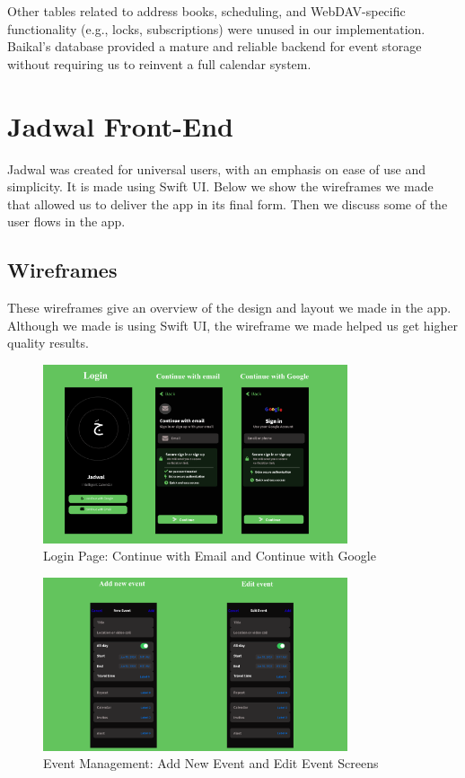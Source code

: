Other tables related to address books, scheduling, and WebDAV-specific functionality (e.g., locks, subscriptions) were unused in our implementation. Baikal's database provided a mature and reliable backend for event storage without requiring us to reinvent a full calendar system.

\section{Jadwal Front-End}

Jadwal was created for universal users, with an emphasis on ease of use and simplicity. It is made using Swift UI. Below we show the wireframes we made that allowed us to deliver the app in its final form. Then we discuss some of the user flows in the app.

\subsection{Wireframes}

These wireframes give an overview of the design and layout we made in the app. Although we made is using Swift UI, the wireframe we made helped us get higher quality results.

\begin{figure}[H]
    \centering
    \includegraphics[width=0.8\textwidth]{images/front-end1.png}
    \caption{Login Page: Continue with Email and Continue with Google}
    \label{fig:wireframe-login}
\end{figure}

\begin{figure}[H]
    \centering
    \includegraphics[width=0.8\textwidth]{images/front-end2.png}
    \caption{Event Management: Add New Event and Edit Event Screens}
    \label{fig:wireframe-events}
\end{figure}

